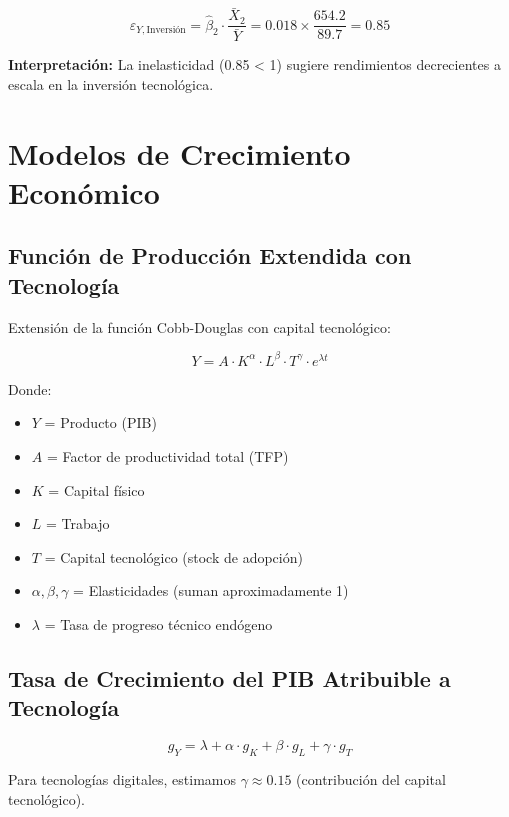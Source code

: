 \documentclass{article}
\begin{document}
\begin{equation}
\varepsilon_{Y,\text{Inversión}} = \hat{\beta}_2 \cdot \frac{\bar{X}_2}{\bar{Y}} = 0.018 \times \frac{654.2}{89.7} = 0.85
\end{equation}

\textbf{Interpretación:} La inelasticidad (0.85 \textless{} 1) sugiere rendimientos decrecientes a escala en la inversión tecnológica.

\section{Modelos de Crecimiento Económico}

\subsection{Función de Producción Extendida con Tecnología}

Extensión de la función Cobb-Douglas con capital tecnológico:

\begin{equation}
Y = A \cdot K^{\alpha} \cdot L^{\beta} \cdot T^{\gamma} \cdot e^{\lambda t}
\end{equation}

Donde:
\begin{itemize}
    \item $Y$ = Producto (PIB)
    \item $A$ = Factor de productividad total (TFP)
    \item $K$ = Capital físico
    \item $L$ = Trabajo
    \item $T$ = Capital tecnológico (stock de adopción)
    \item $\alpha, \beta, \gamma$ = Elasticidades (suman aproximadamente 1)
    \item $\lambda$ = Tasa de progreso técnico endógeno
\end{itemize}

\subsection{Tasa de Crecimiento del PIB Atribuible a Tecnología}

\begin{equation}
g_Y = \lambda + \alpha \cdot g_K + \beta \cdot g_L + \gamma \cdot g_T
\end{equation}

Para tecnologías digitales, estimamos $\gamma \approx 0.15$ (contribución del capital tecnológico).
\end{document}
